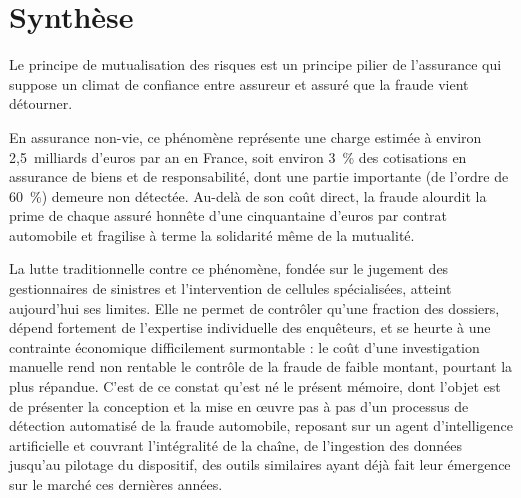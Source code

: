 \chapter*{Synthèse}
{}

%
Le principe de mutualisation des risques est un principe pilier de l'assurance qui suppose un climat de confiance entre assureur et assuré que la fraude vient détourner. 

En assurance non-vie, ce phénomène représente une charge estimée à environ 2,5~milliards d'euros par an en France, soit environ 3~\% des cotisations en assurance de biens et de responsabilité, dont une partie importante (de l'ordre de 60~\%) demeure non détectée. Au-delà de son coût direct, la fraude alourdit la prime de chaque assuré honnête d'une cinquantaine d'euros par contrat automobile et fragilise à terme la solidarité même de la mutualité.

La lutte traditionnelle contre ce phénomène, fondée sur le jugement des gestionnaires de sinistres et l'intervention de cellules spécialisées, atteint aujourd'hui ses limites. Elle ne permet de contrôler qu'une fraction des dossiers, dépend fortement de l'expertise individuelle des enquêteurs, et se heurte à une contrainte économique difficilement surmontable : le coût d'une investigation manuelle rend non rentable le contrôle de la fraude de faible montant, pourtant la plus répandue. C'est de ce constat qu'est né le présent mémoire, dont l'objet est de présenter la conception et la mise en œuvre pas à pas d'un processus de détection automatisé de la fraude automobile, reposant sur un agent d'intelligence artificielle et couvrant l'intégralité de la chaîne, de l'ingestion des données jusqu'au pilotage du dispositif, des outils similaires ayant déjà fait leur émergence sur le marché ces dernières années.

\bigskip

